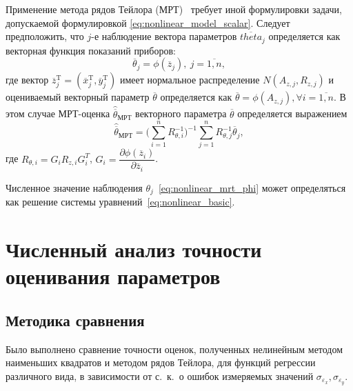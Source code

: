 Применение метода рядов Тейлора (МРТ)~\cite{mukha_2000}
требует иной формулировки задачи, допускаемой формулировкой \eqref{eq:nonlinear_model_scalar}.
Следует предположить, что \( j \)-е наблюдение вектора параметров \( \overline{theta}_j \)
определяется как векторная функция показаний приборов:
\begin{equation}
  \label{eq:nonlinear_mrt_phi}
  \overline{\theta}_j = \phi( \overline{z}_{j} ), \: j = \overline{1, n},
\end{equation}
где вектор
\( \overline{z}^{\text{T}}_{j} =
( \overline{x}^{\text{T}}_{j}, \overline{y}^{\text{T}}_{j}) \)
имеет нормальное распределение \( N(A_{z,j}, R_{z,j}) \)
и оцениваемый векторный параметр \( \overline{\theta} \) определяется как
\( \overline{\theta} = \phi(A_{z,j}), \forall i = \overline{1, n} \).
В этом случае МРТ-оценка \( \hat{\overline{\theta}}_{\text{МРТ}} \) векторного параметра \( \overline{\theta} \)
определяется выражением
\begin{equation}
  \label{eq:nonlinear_mrt}
  \hat{\overline{\theta}}_{\text{МРТ}} =
  \Bigg( \sum^{n}_{i=1} R^{-1}_{\theta,i} \Bigg)^{-1}
  \sum^{n}_{j=1} R^{-1}_{\theta,j} \overline{\theta}_j,
\end{equation}
где
\( R_{\theta,i} = G_i R_{z,i} G^T_i \),
\( G_i =
\dfrac{\partial \phi( \overline{z}_{i} ) }{ \partial \overline{z}_{i} } \).

Численное значение наблюдения \( \theta_j \)~\eqref{eq:nonlinear_mrt_phi} может определяться как
решение системы уравнений~\eqref{eq:nonlinear_basic}.


\section{Численный анализ точности оценивания параметров}

\subsection{Методика сравнения}

Было выполнено сравнение точности оценок,
полученных нелинейным методом наименьших квадратов и методом рядов Тейлора,
для функций регрессии различного вида,
в зависимости от с.~к.~о ошибок измеряемых значений
\( \sigma_{\varepsilon_x}, \sigma_{\varepsilon_y} \).

